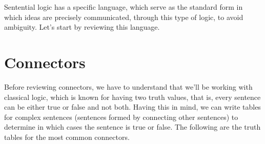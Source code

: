 \documentclass{report}
\begin{document}
    Sentential logic has a specific language, which serve as the standard form in which ideas are precisely communicated, through this type of logic, to avoid ambiguity. Let's start by reviewing this language.

    \section{Connectors}

    Before reviewing connectors, we have to understand that we'll be working with classical logic, which is known for having two truth values, that is, every sentence can be either true or false and not both. Having this in mind, we can write tables for complex sentences (sentences formed by connecting other sentences) to determine in which cases the sentence is true or false. The following are the truth tables for the most common connectors.
\end{document}
